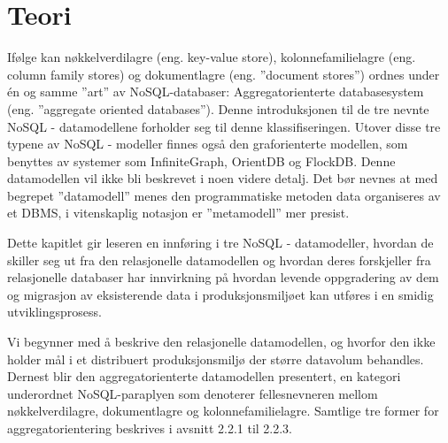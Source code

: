 
\chapter{Teori}
Ifølge \cite{sadalage2013} kan nøkkelverdilagre (eng. key-value store), kolonnefamilielagre (eng. column family stores) og dokumentlagre (eng. ''document stores'') ordnes under én og samme ''art'' av NoSQL-databaser: Aggregatorienterte databasesystem (eng. ''aggregate oriented databases''). Denne introduksjonen til de tre nevnte NoSQL - datamodellene forholder seg til denne klassifiseringen. Utover disse tre typene av NoSQL - modeller finnes også den graforienterte modellen, som benyttes av systemer som InfiniteGraph, OrientDB og FlockDB. Denne datamodellen vil ikke bli beskrevet i noen videre detalj. Det bør nevnes at med begrepet ''datamodell'' menes den programmatiske metoden data organiseres av et DBMS, i vitenskaplig notasjon er ''metamodell'' mer presist.

Dette kapitlet gir leseren en innføring i tre NoSQL - datamodeller, hvordan de skiller seg ut fra den relasjonelle datamodellen og hvordan deres forskjeller fra relasjonelle databaser har innvirkning på hvordan levende oppgradering av dem og migrasjon av eksisterende data i produksjonsmiljøet kan utføres i en smidig utviklingsprosess.

Vi begynner med å beskrive den relasjonelle datamodellen, og hvorfor den ikke holder mål i et distribuert produksjonsmiljø der større datavolum behandles. Dernest blir den aggregatorienterte datamodellen presentert, en kategori underordnet NoSQL-paraplyen som denoterer fellesnevneren mellom nøkkelverdilagre, dokumentlagre og kolonnefamilielagre. Samtlige tre former for aggregatorientering beskrives i avsnitt 2.2.1 til 2.2.3.








\cleardoublepage


